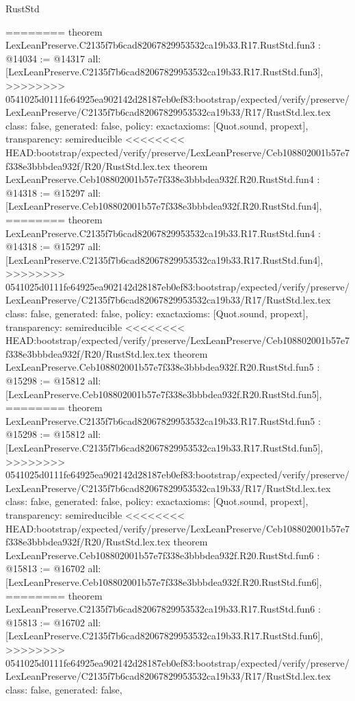 \begin{lexlean}{RustStd}
\begin{coremodule}
{\begin{coremodule}
{{{{{{========
theorem LexLeanPreserve.C2135f7b6cad82067829953532ca19b33.R17.RustStd.fun3 : @14034 := @14317 {
  all: [LexLeanPreserve.C2135f7b6cad82067829953532ca19b33.R17.RustStd.fun3],
>>>>>>>> 0541025d0111fe64925ea902142d28187eb0ef83:bootstrap/expected/verify/preserve/LexLeanPreserve/C2135f7b6cad82067829953532ca19b33/R17/RustStd.lex.tex
  class: false,
  generated: false,
  policy: exact{axioms: [Quot.sound, propext]},
  transparency: semireducible
}
<<<<<<<< HEAD:bootstrap/expected/verify/preserve/LexLeanPreserve/Ceb108802001b57e7f338e3bbbdea932f/R20/RustStd.lex.tex
theorem LexLeanPreserve.Ceb108802001b57e7f338e3bbbdea932f.R20.RustStd.fun4 : @14318 := @15297 {
  all: [LexLeanPreserve.Ceb108802001b57e7f338e3bbbdea932f.R20.RustStd.fun4],
========
theorem LexLeanPreserve.C2135f7b6cad82067829953532ca19b33.R17.RustStd.fun4 : @14318 := @15297 {
  all: [LexLeanPreserve.C2135f7b6cad82067829953532ca19b33.R17.RustStd.fun4],
>>>>>>>> 0541025d0111fe64925ea902142d28187eb0ef83:bootstrap/expected/verify/preserve/LexLeanPreserve/C2135f7b6cad82067829953532ca19b33/R17/RustStd.lex.tex
  class: false,
  generated: false,
  policy: exact{axioms: [Quot.sound, propext]},
  transparency: semireducible
}
<<<<<<<< HEAD:bootstrap/expected/verify/preserve/LexLeanPreserve/Ceb108802001b57e7f338e3bbbdea932f/R20/RustStd.lex.tex
theorem LexLeanPreserve.Ceb108802001b57e7f338e3bbbdea932f.R20.RustStd.fun5 : @15298 := @15812 {
  all: [LexLeanPreserve.Ceb108802001b57e7f338e3bbbdea932f.R20.RustStd.fun5],
========
theorem LexLeanPreserve.C2135f7b6cad82067829953532ca19b33.R17.RustStd.fun5 : @15298 := @15812 {
  all: [LexLeanPreserve.C2135f7b6cad82067829953532ca19b33.R17.RustStd.fun5],
>>>>>>>> 0541025d0111fe64925ea902142d28187eb0ef83:bootstrap/expected/verify/preserve/LexLeanPreserve/C2135f7b6cad82067829953532ca19b33/R17/RustStd.lex.tex
  class: false,
  generated: false,
  policy: exact{axioms: [Quot.sound, propext]},
  transparency: semireducible
}
<<<<<<<< HEAD:bootstrap/expected/verify/preserve/LexLeanPreserve/Ceb108802001b57e7f338e3bbbdea932f/R20/RustStd.lex.tex
theorem LexLeanPreserve.Ceb108802001b57e7f338e3bbbdea932f.R20.RustStd.fun6 : @15813 := @16702 {
  all: [LexLeanPreserve.Ceb108802001b57e7f338e3bbbdea932f.R20.RustStd.fun6],
========
theorem LexLeanPreserve.C2135f7b6cad82067829953532ca19b33.R17.RustStd.fun6 : @15813 := @16702 {
  all: [LexLeanPreserve.C2135f7b6cad82067829953532ca19b33.R17.RustStd.fun6],
>>>>>>>> 0541025d0111fe64925ea902142d28187eb0ef83:bootstrap/expected/verify/preserve/LexLeanPreserve/C2135f7b6cad82067829953532ca19b33/R17/RustStd.lex.tex
  class: false,
  generated: false,
}}}}}}}}}}
\end{coremodule}}
\end{coremodule}
\end{lexlean}
